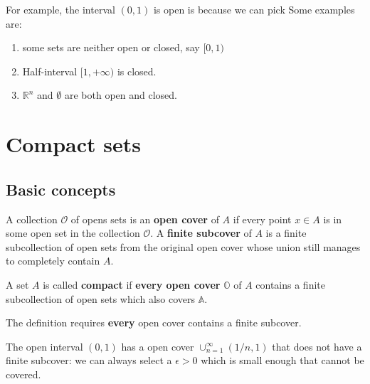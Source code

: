 \begin{refsection}
\begin{example}
For example, the interval $(0,1)$ is open is because we can pick 
Some examples are:
\begin{enumerate}
    \item some sets are neither open or closed, say $[0,1)$
    \item Half-interval $[1,+\infty)$ is closed.
    \item $\mathbb{R}^n$ and $\emptyset$ are both open and closed. 
\end{enumerate}
\end{example}






\section{Compact sets}
\subsection{Basic concepts}
\begin{definition}
\cite{spivak}\cite[98]{abbott2001understanding}\cite[144]{johnsonbaugh2010foundations}A collection $\mathcal{O}$ of opens sets is an \textbf{open cover} of $A$ if every point $x \in A$ is in some open set in the collection $\mathcal{O}$. A \textbf{finite subcover} of $A$ is a finite subcollection of open sets from the original open cover whose union still manages to completely contain $A$.
\end{definition}

\begin{definition}
A set $A$ is called \textbf{compact} if \textbf{every open cover} $\mathbb{O}$ of $A$ contains a finite subcollection of open sets which also covers $\mathbb{A}$.
\end{definition}

\begin{remark}
The definition requires \textbf{every} open cover contains a finite subcover.  
\end{remark}

\begin{example}
\cite[98]{abbott2001understanding}The open interval $(0,1)$ has a open cover $\cup_{n=1}^\infty (1/n,1)$ that does not have a finite subcover: we can always select a $\epsilon >0$ which is small enough that cannot be covered.
\end{example}



\end{refsection}
